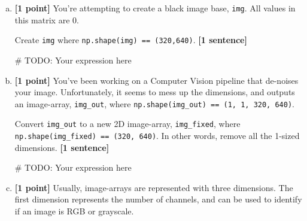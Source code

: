 \documentclass[11pt]{article}
\begin{document}
\begin{enumerate}[(a)]
    \item \textbf{[1 point]} You're attempting to create a black image base, \texttt{img}. All values in this matrix are 0. 
    
    \begin{tcolorbox}[colback=orange!5!white,colframe=orange!75!black]
    Create \texttt{img} where \texttt{np.shape(img) == (320,640)}. \textbf{[1 sentence]}
    \end{tcolorbox}
    
    \begin{tcolorbox}[colback=white!5!white,colframe=green!75!black,height=2cm]
    \begin{python}
    # TODO: Your expression here
    \end{python}
    \end{tcolorbox}
    
    \item \textbf{[1 point]} You've been working on a Computer Vision pipeline that de-noises your image. Unfortunately, it seems to mess up the dimensions, and outputs an image-array, \texttt{img\_out}, where \texttt{np.shape(img\_out) == (1, 1, 320, 640)}. 
    
    \begin{tcolorbox}[colback=orange!5!white,colframe=orange!75!black]
    Convert \texttt{img\_out} to a new 2D image-array, \texttt{img\_fixed}, where \texttt{np.shape(img\_fixed) == (320, 640)}. In other words, remove all the 1-sized dimensions. \textbf{[1 sentence]}
    \end{tcolorbox}

\begin{tcolorbox}[colback=white!5!white,colframe=green!75!black,height=2cm]
    \begin{python}
    # TODO: Your expression here
    \end{python}
    \end{tcolorbox}
    
    \item \textbf{[1 point]} Usually, image-arrays are represented with three dimensions. The first dimension represents the number of channels, and can be used to identify if an image is RGB or grayscale. 
    

\end{enumerate}
\end{document}
